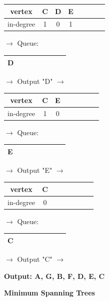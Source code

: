 \documentclass[12pt]{exam}
\begin{document}
\begin{questions}
\begin{tabular}{ |c|c|c|c|c|c|c|c| }
\hline
vertex & C & D & E  \\
\hline
in-degree & 1 & 0 & 1  \\
\hline
\end{tabular}
$\rightarrow$ 
Queue: 
\begin{tabular}{ c c c c c c c c }
\hline
D \\
\hline
\end{tabular}
$\rightarrow$ Output "D" $\rightarrow$

\begin{tabular}{ |c|c|c|c|c|c|c|c| }
\hline
vertex & C & E \\
\hline
in-degree & 1 & 0 \\
\hline
\end{tabular}
$\rightarrow$ 
Queue: 
\begin{tabular}{ c c c c c c c c }
\hline
E \\
\hline
\end{tabular}
$\rightarrow$ Output "E" $\rightarrow$

\begin{tabular}{ |c|c|c|c|c|c|c|c| }
\hline
vertex & C  \\
\hline
in-degree & 0  \\
\hline
\end{tabular}
$\rightarrow$ 
Queue: 
\begin{tabular}{ c c c c c c c c }
\hline
C \\
\hline
\end{tabular}
$\rightarrow$ Output "C" $\rightarrow$

{\bf Output: A, G, B, F, D, E, C}

\question 
{\bf Minimum Spanning Trees}
\end{questions}
\end{document}

